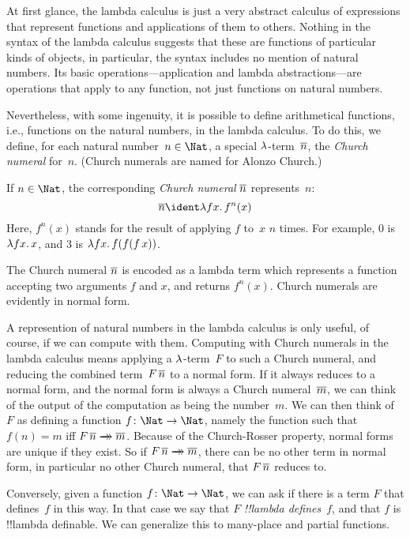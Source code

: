 \documentclass[../../../include/open-logic-section]{subfiles}
\begin{document}

At first glance, the lambda calculus is just a very abstract calculus
of expressions that represent functions and applications of them to
others. Nothing in the syntax of the lambda calculus suggests that
these are functions of particular kinds of objects, in particular, the
syntax includes no mention of natural numbers. Its basic
operations---application and lambda abstractions---are operations that
apply to any function, not just functions on natural
numbers.

Nevertheless, with some ingenuity, it is possible to define
arithmetical functions, i.e., functions on the natural numbers, in the
lambda calculus. To do this, we define, for each natural number~$n \in
\Nat$, a special $\lambd$-term~$\overline{n}$, the \emph{Church numeral}
for~$n$. (Church numerals are named for Alonzo Church.)

\begin{defn}
  If $n \in \Nat$, the corresponding \emph{Church numeral} $\overline{n}$
  represents~$n$:
  \[
    \num{n} \ident \lambd[fx][f^n(x)]
  \]
  Here, $f^n(x)$ stands for the result of applying $f$ to~$x$ $n$
  times. For example, $\num{0}$ is $\lambd[fx][x]$, and $\num{3}$ is
  $\lambd[fx][f(f(f\,x))]$.
\end{defn}
  
The Church numeral $\overline{n}$ is encoded as a lambda term which
represents a function accepting two arguments $f$ and $x$, and
returns $f^n(x)$. Church numerals are evidently in normal form.

A represention of natural numbers in the lambda calculus is only
useful, of course, if we can compute with them.  Computing with Church
numerals in the lambda calculus means applying a $\lambd$-term~$F$ to
such a Church numeral, and reducing the combined term~$F\, \overline{n}$ to
a normal form. If it always reduces to a normal form, and the normal
form is always a Church numeral~$\overline{m}$, we can think of the output
of the computation as being the number~$m$. We can then think of~$F$
as defining a function $f\colon \Nat \to \Nat$, namely the function
such that $f(n) = m$ iff $F\, \num n \red \num m$. Because of the
Church-Rosser property, normal forms are unique if they exist. So if
$F\, \num n \red \num m$, there can be no other term in normal form,
in particular no other Church numeral, that $F \, \overline{n}$ reduces to.

Conversely, given a function $f\colon \Nat \to \Nat$,
we can ask if there is a term $F$ that defines~$f$ in this way. In
that case we say that $F$ \emph{!!{lambda define}s}~$f$, and that $f$ is
!!{lambda definable}. We can generalize this to many-place and partial
functions.
\end{document}
